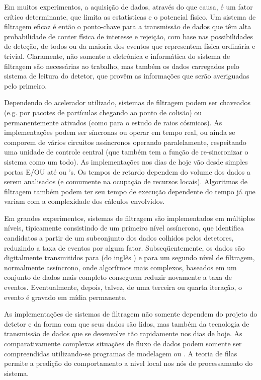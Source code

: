 Em muitos experimentos, a aquisição de dados, através do  que
causa, é um fator crítico determinante, que limita as estatísticas e o
potencial físico. Um sistema de filtragem eficaz é então o ponto-chave para a
transmissão de dados que têm alta probabilidade de conter física de interesse
e rejeição, com base nas possibilidades de deteção, de todos ou da maioria dos
eventos que representem física ordinária e trivial. Claramente, não somente a
eletrônica e informática do sistema de filtragem são necessárias ao trabalho,
mas também os dados carregados pelo sistema de leitura do detetor, que provêm
as informações que serão averiguadas pelo primeiro.

Dependendo do acelerador utilizado, sistemas de filtragem podem ser chaveados
(e.g. por pacotes de partículas chegando ao ponto de colisão) ou
permanentemente ativados (como para o estudo de raios cósmicos). As
implementações podem ser síncronas ou operar em tempo real, ou ainda
se comporem de vários circuitos assíncronos operando paralelamente,
respeitando uma unidade de controle central (que também tem a função de
re-sincronizar o sistema como um todo). As implementações nos dias de hoje vão
desde simples portas E/OU até  ou
's. Os tempos de retardo dependem do volume dos dados a serem
analisados (e comumente na ocupação de recursos locais). Algoritmos de
filtragem também podem ter seu tempo de execução dependente do tempo já que
variam com a complexidade dos cálculos envolvidos.

Em grandes experimentos, sistemas de filtragem são implementados em múltiplos
níveis, tipicamente consistindo de um primeiro nível assíncrono, que identifica
candidatos a partir de um subconjunto dos dados colhidos pelos detetores,
reduzindo a taxa de eventos por algum fator. Subseqüentemente, os dados são
digitalmente transmitidos para  (do inglês
) e para um segundo nível de filtragem, normalmente assíncrono,
onde algorítmos mais complexos, baseados em um conjunto de dados mais completo
conseguem reduzir novamente a taxa de eventos. Eventualmente, depois, talvez,
de uma terceira ou quarta iteração, o evento é gravado em mídia permanente.

As implementações de sistemas de filtragem não somente dependem do projeto do
detetor e da forma com que seus dados são lidos, mas também da tecnologia de
transmissão de dados que se desenvolve tão rapidamente nos dias de hoje. As
comparativamente complexas situações de fluxo de dados podem somente ser
compreendidas utilizando-se programas de modelagem ou . A teoria de filas permite a predição do comportamento a nivel local
nos nós de processamento do sistema.

